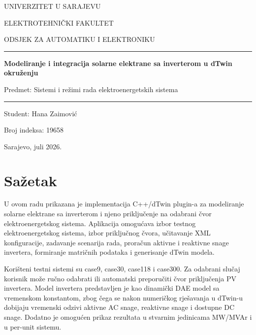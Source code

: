 \documentclass[12pt,a4paper]{article}
\begin{document}
\begin{titlepage}
\centering
\vspace*{1.8cm}
{\Large UNIVERZITET U SARAJEVU\par}
\vspace{0.7cm}
{\large ELEKTROTEHNIČKI FAKULTET\par}
{\large ODSJEK ZA AUTOMATIKU I ELEKTRONIKU\par}
\vspace{4.0cm}
\rule{0.82\textwidth}{0.4pt}
\vspace{0.8cm}

{\LARGE\bfseries Modeliranje i integracija solarne elektrane sa inverterom u dTwin okruženju\par}
\vspace{0.35cm}
{\large Predmet: Sistemi i režimi rada elektroenergetskih sistema\par}
\vspace{0.8cm}
\rule{0.82\textwidth}{0.4pt}
\vspace{1.2cm}

{\large Student: Hana Zaimović\par}
{\large Broj indeksa: 19658\par}
\vfill
{\large Sarajevo, juli 2026.\par}
\end{titlepage}


\section*{Sažetak}
U ovom radu prikazana je implementacija C++/dTwin plugin-a za modeliranje solarne elektrane sa inverterom i njeno priključenje na odabrani čvor elektroenergetskog sistema. Aplikacija omogućava izbor testnog elektroenergetskog sistema, izbor priključnog čvora, učitavanje XML konfiguracije, zadavanje scenarija rada, proračun aktivne i reaktivne snage invertera, formiranje matričnih podataka i generisanje dTwin modela.

Korišteni testni sistemi su case9, case30, case118 i case300. Za odabrani slučaj korisnik može ručno odabrati ili automatski preporučiti čvor priključenja PV invertera. Model invertera predstavljen je kao dinamički DAE model sa vremenskom konstantom, zbog čega se nakon numeričkog rješavanja u dTwin-u dobijaju vremenski odzivi aktivne AC snage, reaktivne snage i dostupne DC snage. Dodatno je omogućen prikaz rezultata u stvarnim jedinicama MW/MVAr i u per-unit sistemu.
\end{document}

